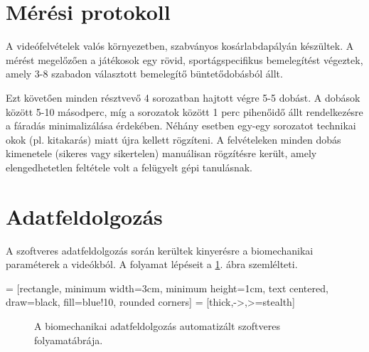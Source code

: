 \section{Mérési protokoll}
A videófelvételek valós környezetben, szabványos kosárlabdapályán készültek. A mérést megelőzően a játékosok egy rövid, sportágspecifikus bemelegítést végeztek, amely 3-8 szabadon választott bemelegítő büntetődobásból állt.

Ezt követően minden résztvevő 4 sorozatban hajtott végre 5-5 dobást. A dobások között 5-10 másodperc, míg a sorozatok között 1 perc pihenőidő állt rendelkezésre a fáradás minimalizálása érdekében. Néhány esetben egy-egy sorozatot technikai okok (pl. kitakarás) miatt újra kellett rögzíteni. A felvételeken minden dobás kimenetele (sikeres vagy sikertelen) manuálisan rögzítésre került, amely elengedhetetlen feltétele volt a felügyelt gépi tanulásnak.

\section{Adatfeldolgozás}
A szoftveres adatfeldolgozás során kerültek kinyerésre a biomechanikai paraméterek a videókból. A folyamat lépéseit a \ref{fig:pipeline_flowchart}. ábra szemlélteti.

 = [rectangle, minimum width=3cm, minimum height=1cm, text centered, draw=black, fill=blue!10, rounded corners]
 = [thick,->,>=stealth]

\begin{figure}[!ht]
    \centering
    \caption{A biomechanikai adatfeldolgozás automatizált szoftveres folyamatábrája.}
    \label{fig:pipeline_flowchart}
\end{figure}

